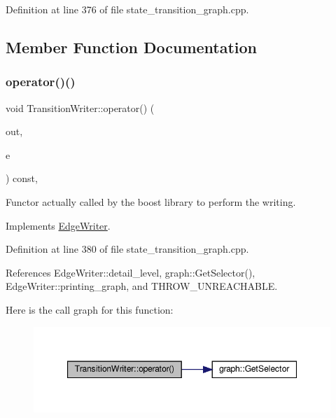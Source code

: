 Definition at line 376 of file state\+\_\+transition\+\_\+graph.\+cpp.



\subsection{Member Function Documentation}
\mbox{\label{classTransitionWriter_a6df1e95524ed8a5e00264577f75e54c5}} 
\subsubsection{\texorpdfstring{operator()()}{operator()()}}
{\footnotesize\ttfamily void Transition\+Writer\+::operator() (\begin{DoxyParamCaption}\item[{std\+::ostream \&}]{out,  }\item[{const \hyperlink{graph_8hpp_a9eb9afea34e09f484b21f2efd263dd48}{Edge\+Descriptor} \&}]{e }\end{DoxyParamCaption}) const\hspace{0.3cm}{\ttfamily [override]}, {\ttfamily [virtual]}}



Functor actually called by the boost library to perform the writing. 



Implements \hyperlink{classEdgeWriter_a04dc5b68a11dcf253e21d29dfd1e06c3}{Edge\+Writer}.



Definition at line 380 of file state\+\_\+transition\+\_\+graph.\+cpp.



References Edge\+Writer\+::detail\+\_\+level, graph\+::\+Get\+Selector(), Edge\+Writer\+::printing\+\_\+graph, and T\+H\+R\+O\+W\+\_\+\+U\+N\+R\+E\+A\+C\+H\+A\+B\+LE.

Here is the call graph for this function\+:
\nopagebreak
\begin{figure}[H]
\begin{center}
\leavevmode
\includegraphics[width=347pt]{dd/dbc/classTransitionWriter_a6df1e95524ed8a5e00264577f75e54c5_cgraph}
\end{center}
\end{figure}


